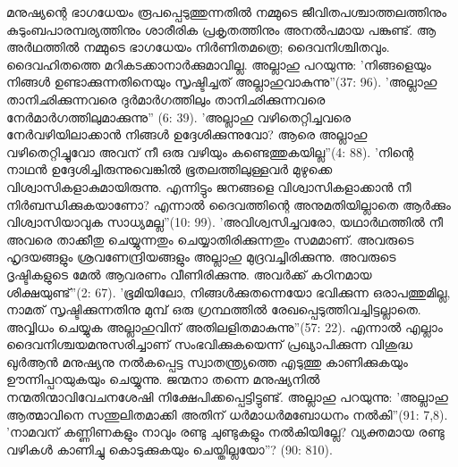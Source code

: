 മനുഷ്യന്റെ ഭാഗധേയം രൂപപ്പെടുത്തുന്നതില്‍ നമ്മുടെ ജീവിതപശ്ചാത്തലത്തിനും കുടുംബപാരമ്പര്യത്തിനും ശാരീരിക പ്രകൃതത്തിനും അനല്‍പമായ പങ്കുണ്ട്. ആ അര്‍ഥത്തില്‍ നമ്മുടെ ഭാഗധേയം നിര്‍ണിതമത്രെ; ദൈവനിശ്ചിതവും. ദൈവഹിതത്തെ മറികടക്കാനാര്‍ക്കുമാവില്ല. അല്ലാഹു പറയുന്നു: 'നിങ്ങളെയും നിങ്ങള്‍ ഉണ്ടാക്കുന്നതിനെയും സൃഷ്ടിച്ചത് അല്ലാഹുവാകുന്നു''(37: 96). 'അല്ലാഹു താനിഛിക്കുന്നവരെ ദുര്‍മാര്‍ഗത്തിലും താനിഛിക്കുന്നവരെ നേര്‍മാര്‍ഗത്തിലുമാക്കുന്നു'' (6: 39). 'അല്ലാഹു വഴിതെറ്റിച്ചവരെ നേര്‍വഴിയിലാക്കാന്‍ നിങ്ങള്‍ ഉദ്ദേശിക്കുന്നുവോ? ആരെ അല്ലാഹു വഴിതെറ്റിച്ചുവോ അവന് നീ ഒരു വഴിയും കണ്ടെത്തുകയില്ല''(4: 88). 'നിന്റെ നാഥന്‍ ഉദ്ദേശിച്ചിരുന്നുവെങ്കില്‍ ഭൂതലത്തിലുള്ളവര്‍ മുഴുക്കെ വിശ്വാസികളാകുമായിരുന്നു. എന്നിട്ടും ജനങ്ങളെ വിശ്വാസികളാക്കാന്‍ നീ നിര്‍ബന്ധിക്കുകയാണോ? എന്നാല്‍ ദൈവത്തിന്റെ അനുമതിയില്ലാതെ ആര്‍ക്കും വിശ്വാസിയാവുക സാധ്യമല്ല''(10: 99). 'അവിശ്വസിച്ചവരോ, യഥാര്‍ഥത്തില്‍ നീ അവരെ താക്കീതു ചെയ്യുന്നതും ചെയ്യാതിരിക്കുന്നതും സമമാണ്. അവരുടെ ഹൃദയങ്ങളും ശ്രവണേന്ദ്രിയങ്ങളും അല്ലാഹു മുദ്രവച്ചിരിക്കുന്നു. അവരുടെ ദൃഷ്ടികളുടെ മേല്‍ ആവരണം വീണിരിക്കുന്നു. അവര്‍ക്ക് കഠിനമായ ശിക്ഷയുണ്ട്''(2: 67). 'ഭൂമിയിലോ, നിങ്ങള്‍ക്കുതന്നെയോ ഭവിക്കുന്ന ഒരാപത്തുമില്ല, നാമത് സൃഷ്ടിക്കുന്നതിനു മുമ്പ് ഒരു ഗ്രന്ഥത്തില്‍ രേഖപ്പെടുത്തിവച്ചിട്ടല്ലാതെ. അവ്വിധം ചെയ്യുക അല്ലാഹുവിന് അതിലളിതമാകുന്നു''(57: 22).
എന്നാല്‍ എല്ലാം ദൈവനിശ്ചയമനുസരിച്ചാണ് സംഭവിക്കുകയെന്ന് പ്രഖ്യാപിക്കുന്ന വിശുദ്ധ ഖുര്‍ആന്‍ മനുഷ്യനു നല്‍കപ്പെട്ട സ്വാതന്ത്യ്രത്തെ എടുത്തു കാണിക്കുകയും ഊന്നിപ്പറയുകയും ചെയ്യുന്നു. ജന്മനാ തന്നെ മനുഷ്യനില്‍ നന്മതിന്മാവിവേചനശേഷി നിക്ഷേപിക്കപ്പെട്ടിട്ടുണ്ട്. അല്ലാഹു പറയുന്നു: 'അല്ലാഹു ആത്മാവിനെ സന്തുലിതമാക്കി അതിന് ധര്‍മാധര്‍മബോധനം നല്‍കി''(91: 7,8). 'നാമവന് കണ്ണിണകളും നാവും രണ്ടു ചുണ്ടുകളും നല്‍കിയില്ലേ? വ്യക്തമായ രണ്ടു വഴികള്‍ കാണിച്ചു കൊടുക്കുകയും ചെയ്തില്ലയോ''? (90: 810).
